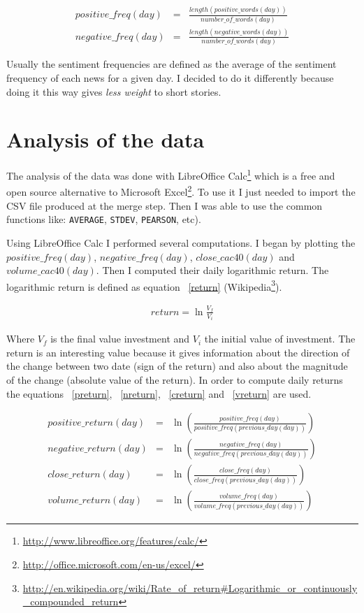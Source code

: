 \documentclass[12pt]{report}
\begin{document}
\begin{eqnarray}
	positive\_freq(day) &=& \frac{length(positive\_words(day))}{number\_of\_words(day)}\label{pfreq}\\
			 negative\_freq(day) &=& \frac{length(negative\_words(day))}{number\_of\_words(day)}\label{nfreq}
\end{eqnarray}

Usually the sentiment frequencies are defined as the average of the sentiment frequency of each news for a given day. I decided to do it differently because doing it this way gives \emph{less weight} to short stories.

\section{Analysis of the data}

The analysis of the data was done with LibreOffice Calc\footnote{\url{http://www.libreoffice.org/features/calc/}} which is a free and open source alternative to Microsoft Excel\footnote{\url{http://office.microsoft.com/en-us/excel/}}. To use it I just needed to import the  CSV file produced at the merge step. Then I was able to use the common functions like: \lstinline!AVERAGE!, \lstinline!STDEV!, \lstinline!PEARSON!, etc).

Using LibreOffice Calc I performed several computations. I began by plotting the $positive\_freq(day)$, $negative\_freq(day)$, $close\_cac40(day)$ and $volume\_cac40(day)$. Then I computed their daily logarithmic return. The logarithmic return is defined as equation ~\ref{return} (Wikipedia\footnote{\url{http://en.wikipedia.org/wiki/Rate_of_return\#Logarithmic_or_continuously_compounded_return}}).

\begin{eqnarray}
	return = \ln\frac{V_f}{V_i}\label{return}
\end{eqnarray}

Where $V_f$ is the final value investment and $V_i$ the initial value of investment. The return is an interesting value because it gives information about the direction of the change between two date (sign of the return) and also about the magnitude of the change (absolute value of the return). In order to compute daily returns the equations ~\ref{preturn}, ~\ref{nreturn}, ~\ref{creturn} and ~\ref{vreturn} are used.

\begin{eqnarray}
	positive\_return(day) &=& \ln\left(\frac{positive\_freq(day)}{positive\_freq(previous\_day(day))}\right)\label{preturn}\\
			 negative\_return(day) &=& \ln\left(\frac{negative\_freq(day)}{negative\_freq(previous\_day(day))}\right)\label{nreturn}\\
				   close\_return(day) &=& \ln\left(\frac{close\_freq(day)}{close\_freq(previous\_day(day))}\right)\label{creturn}\\
				  volume\_return(day) &=& \ln\left(\frac{volume\_freq(day)}{volume\_freq(previous\_day(day))}\right)\label{vreturn}
\end{eqnarray}
\end{document}
